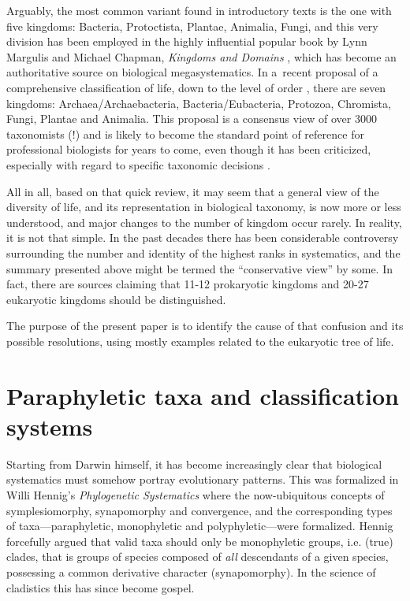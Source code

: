 \begin{artengenv}
Arguably, the most common variant found in introductory texts is the one with five kingdoms: Bacteria, Protoctista,
Plantae, Animalia, Fungi, and this very division has been employed in the highly influential popular book by Lynn
Margulis and Michael Chapman, \textit{Kingdoms and Domains}
\parencite*{margulis_kingdoms_2009},
which has become an authoritative source on biological megasystematics. In a~recent proposal of a comprehensive
classification of life, down to the level of order
\parencite{ruggiero_higher_2015},
there are seven
kingdoms: Archaea/Archaebacteria, Bacteria/Eubacteria, Protozoa, Chromista, Fungi, Plantae and Animalia. This proposal
is a consensus view of over 3000 taxonomists (!) and is likely to become the standard point of reference for
professional biologists for years to come, even though it has been criticized, especially with regard to specific
taxonomic decisions
\parencite[e.g.][]{tedersoo_high-level_2018}.

All in all, based on that quick review, it may seem that a general view of the diversity of life, and its representation
in biological taxonomy, is now more or less understood, and major changes to the number of kingdom occur rarely. In
reality, it is not that simple. In the past decades there has been considerable controversy surrounding the number and
identity of the highest ranks in systematics, and the summary presented above might be termed the ``conservative view''
by some. In fact, there are sources claiming that 11-12 prokaryotic kingdoms
\parencite{petitjean_rooting_2014}
and 20-27 eukaryotic kingdoms
\parencite{pawlowski_new_2013,tedersoo_proposal_2017}
should be
distinguished.

The purpose of the present paper is to identify the cause of that confusion and its possible resolutions, using mostly
examples related to the eukaryotic tree of life.

\section{Paraphyletic taxa and classification systems}

Starting from Darwin himself, it has become increasingly clear that biological systematics must somehow portray
evolutionary patterns. This was formalized in Willi Hennig’s \textit{Phylogenetic Systematics}
\parencite*{hennig_phylogenetic_1966}
where the now-ubiquitous concepts of symplesiomorphy, synapomorphy and
convergence, and the corresponding types of taxa---paraphyletic, monophyletic and polyphyletic---were formalized.
Hennig forcefully argued that valid taxa should only be monophyletic groups, i.e. (true) clades, that is groups of
species composed of \textit{all} descendants of a given species, possessing a common derivative character
(synapomorphy). In the science of cladistics this has since become gospel.


\end{artengenv}

